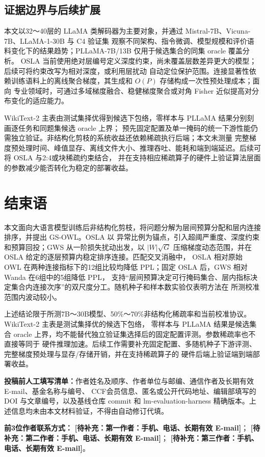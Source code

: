 \documentclass[UTF8,fontset=fandol]{ctexart}
\newcommand{\method}{GS-OWL}
\newcommand{\placeholder}[1]{\textbf{[待补充：#1]}}
\begin{document}
\subsection{证据边界与后续扩展}

本文以32～40层的 LLaMA 类解码器为主要对象，并通过 Mistral-7B、Vicuna-7B、LLaMA-1-30B 与 C4 验证集
观察不同架构、指令微调、模型规模和评价语料变化下的结果趋势；PLLaMA-7B/13B 仅用于候选集合的同集 oracle 覆盖分析。
OSLA 当前使用绝对层编号定义深度约束，尚未覆盖层数差异更大的模型；后续可将约束改写为相对深度，或利用层扰动
自动定位保护范围。连接显著性依赖训练语料上的离线聚合梯度，其生成和 $O(P)$ 存储构成一次性预处理成本；面向
专业领域时，可通过多域梯度融合、稳健梯度聚合或对角 Fisher 近似提高对分布变化的适应能力。

WikiText-2 主表由测试集择优得到候选下包络，零样本与 PLLaMA 结果分别刻画逐任务和同题集候选 oracle 上界；
预先固定配置及单一掩码的统一下游性能仍需独立验证。非结构化剪枝的系统收益还依赖稀疏执行后端；本文未测量
完整梯度预处理时间、峰值显存、离线文件大小、推理吞吐、能耗和端到端延迟。后续可将 OSLA 与2:4或块稀疏约束结合，
并在支持相应稀疏算子的硬件上验证算法层面的参数减少能否转化为稳定的部署收益。

\section{结束语}

本文面向大语言模型训练后非结构化剪枝，将问题分解为层间预算分配和层内连接排序，并提出 \method。OSLA 以
异常比例为锚点，引入超阈严重度、深度约束和预算回投；GWS 从一阶损失扰动出发，以
$\lvert W\rvert\sqrt{G}$ 压缩梯度动态范围，并在 OSLA 给定的逐层预算内稳定排序连接。匹配交叉消融中，
OSLA 相对原始 OWL 在两种连接指标下的12组比较均降低 PPL；固定 OSLA 后，GWS 相对 Wanda 在6组中的5组降低 PPL，
支持“层间预算决定可行掩码集合、层内指标决定集合内连接次序”的双尺度分工。随机种子和样本数实验仅表明方法在
所测校准范围内波动较小。

上述结论限于所测7B～30B模型、50\%～70\%非结构化稀疏率和当前校准协议。WikiText-2 主表是测试集择优的候选下包络，
零样本与 PLLaMA 结果是候选集合 oracle 上界，均不能替代独立验证集选择后的固定配置评测。参数稀疏率也不直接等同于
硬件推理加速。后续工作需要补充固定配置、多随机种子下游评测、完整梯度预处理与显存/存储开销，并在支持稀疏算子的
硬件后端上验证端到端部署收益。

\vspace{3pt}
\noindent\textbf{投稿前人工填写清单：}作者姓名及顺序、作者单位与邮编、通信作者及长期有效 E-mail、基金名称与编号、
CCF会员信息、匿名或公开代码地址、编辑部填写的 DOI 与文章编号，以及基线仓库 commit 和
lm-evaluation-harness 精确版本。上述信息均未由本文材料验证，不得由自动修订代填。

\FloatBarrier


\vspace{4pt}
\noindent\textbf{前3位作者联系方式：}
\placeholder{第一作者：手机、电话、长期有效 E-mail}；
\placeholder{第二作者：手机、电话、长期有效 E-mail}；
\placeholder{第三作者：手机、电话、长期有效 E-mail}。
\end{document}

